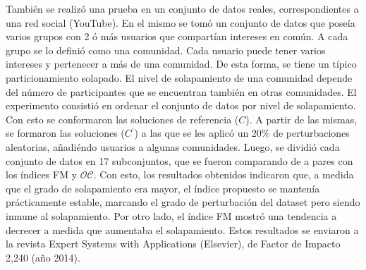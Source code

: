 \documentclass[a4paper,8pt]{article}
\begin{document}
También se realizó una prueba en un conjunto de datos reales, correspondientes a una red social (YouTube)\cite{yang_defining_2013}. En el mismo se tomó un conjunto de datos que poseía varios grupos con 2 ó más usuarios que compartían intereses en común. A cada grupo se lo definió como una comunidad. Cada usuario puede tener varios intereses y pertenecer a más de una comunidad. De esta forma, se tiene un típico particionamiento solapado. El nivel de solapamiento de una comunidad depende del número de participantes que se encuentran también en otras comunidades. El experimento consistió en ordenar el conjunto de datos por nivel de solapamiento. Con esto se conformaron las soluciones de referencia ($C$).  
A partir de las mismas, se formaron las soluciones ($C^\prime$) a las que se les aplicó un 20\% de perturbaciones aleatorias, añadiéndo usuarios a algunas comunidades. Luego, se dividió cada conjunto de datos en 17 subconjuntos, que se fueron comparando de a pares con los índices FM y $\mathcal{OC}$. Con esto, los resultados obtenidos indicaron que, a medida que el grado de solapamiento era mayor, el índice propuesto se mantenía prácticamente estable, marcando el grado de perturbación del dataset pero siendo inmune al solapamiento. Por otro lado, el índice FM mostró una tendencia a decrecer a medida que aumentaba el solapamiento. Estos resultados se enviaron a la revista Expert Systems with Applications (Elsevier), de Factor de Impacto 2,240 (año 2014).
\end{document}
